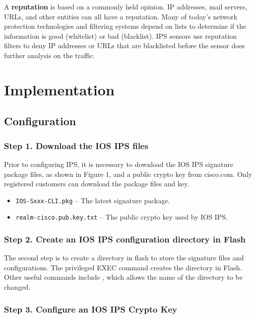 A \textbf{reputation} is based on a commonly held opinion. IP addresses, mail servers, URLs, and other entities can all have a reputation. Many of today’s network protection technologies and filtering systems depend on lists to determine if the information is good (whitelist) or bad (blacklist). IPS sensors use reputation filters to deny IP addresses or URLs that are blacklisted before the sensor does further analysis on the traffic.
\section{Implementation}

\subsection{Configuration}

\subsubsection{Step 1. Download the IOS IPS files}

Prior to configuring IPS, it is necessary to download the IOS IPS signature package files, as shown in Figure 1, and a public crypto key from cisco.com. Only registered customers can download the package files and key.

\begin{itemize}
\item \verb|IOS-Sxxx-CLI.pkg| -- The latest signature package.
\item \verb|realm-cisco.pub.key.txt| -- The public crypto key used by IOS IPS.
\end{itemize}

\subsubsection{Step 2. Create an IOS IPS configuration directory in Flash}

The second step is to create a directory in flash to store the signature files and configurations. The  privileged EXEC command creates the directory in Flash. Other useful commands include , which allows the name of the directory to be changed. 

\subsubsection{Step 3. Configure an IOS IPS Crypto Key}

